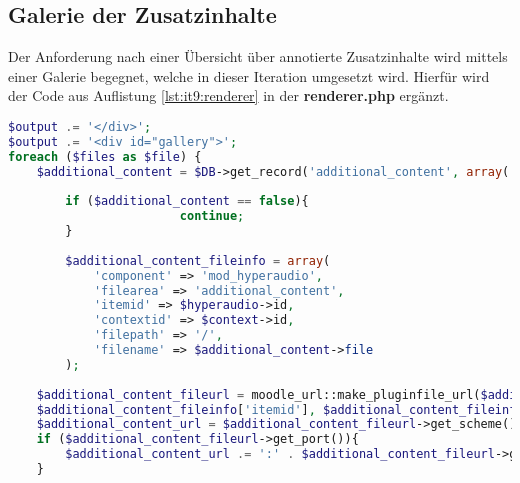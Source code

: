 \subsection{Galerie der Zusatzinhalte}
Der Anforderung nach einer Übersicht über annotierte Zusatzinhalte wird mittels einer Galerie begegnet, welche in dieser Iteration umgesetzt wird. Hierfür wird der Code aus Auflistung \ref{lst:it9:renderer} in der \textbf{renderer.php} ergänzt.

\begin{lstlisting}[language=php,
             linewidth=\textwidth,
             caption={Ausschnitt der \textbf{renderer.php} in der 9. Iteration},
             label={lst:it9:renderer}]
$output .= '</div>';
$output .= '<div id="gallery">';
foreach ($files as $file) {
	$additional_content = $DB->get_record('additional_content', array('hyperaudio_id' => $hyperaudio->id, 'file' => $file->get_filename()), '*', IGNORE_MISSING);
                    
		if ($additional_content == false){
                        continue;
		}
                    
		$additional_content_fileinfo = array(
			'component' => 'mod_hyperaudio',
			'filearea' => 'additional_content',
			'itemid' => $hyperaudio->id,
			'contextid' => $context->id,
			'filepath' => '/',
			'filename' => $additional_content->file
		);
                    
	$additional_content_fileurl = moodle_url::make_pluginfile_url($additional_content_fileinfo['contextid'], $additional_content_fileinfo['component'], $additional_content_fileinfo['filearea'],
	$additional_content_fileinfo['itemid'], $additional_content_fileinfo['filepath'], $additional_content_fileinfo['filename']);
	$additional_content_url = $additional_content_fileurl->get_scheme() . '://' . $additional_content_fileurl->get_host() . $additional_content_fileurl->get_path();
	if ($additional_content_fileurl->get_port()){
		$additional_content_url .= ':' . $additional_content_fileurl->get_port();
	}
                    

\end{lstlisting}

